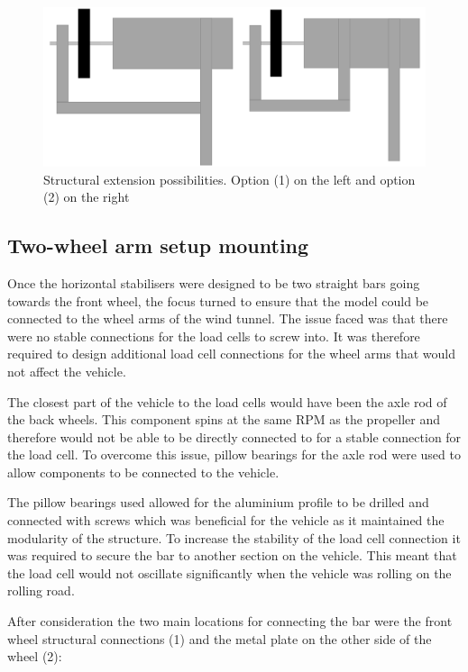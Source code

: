\begin{figure}[!htbp]
    \centering
    \includegraphics{images/part10/mountstruct.png}
    \caption{Structural extension possibilities. Option (1) on the left and option (2) on the right}
    \label{fig:mountstruct}
\end{figure}

\subsection{Two-wheel arm setup mounting}

Once the horizontal stabilisers were designed to be two straight bars going towards the front wheel, the focus turned to ensure that the model could be connected to the wheel arms of the wind tunnel. The issue faced was that there were no stable connections for the load cells to screw into. It was therefore required to design additional load cell connections for the wheel arms that would not affect the vehicle.

The closest part of the vehicle to the load cells would have been the axle rod of the back wheels. This component spins at the same RPM as the propeller and therefore would not be able to be directly connected to for a stable connection for the load cell. To overcome this issue, pillow bearings for the axle rod were used to allow components to be connected to the vehicle. 

The pillow bearings used allowed for the aluminium profile to be drilled and connected with screws which was beneficial for the vehicle as it maintained the modularity of the structure. To increase the stability of the load cell connection it was required to secure the bar to another section on the vehicle. This meant that the load cell would not oscillate significantly when the vehicle was rolling on the rolling road.

After consideration the two main locations for connecting the bar were the front wheel structural connections (1) and the metal plate on the other side of the wheel (2):



